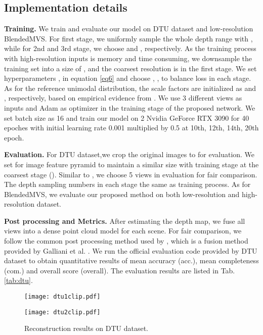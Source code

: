 \documentclass{article}
\begin{document}
\vspace{1mm}

\subsection{Implementation details}
{\bf Training.}
We train and evaluate our model on DTU dataset and low-resolution BlendedMVS.
For first stage, we uniformly sample the whole depth range  with , while for 2nd and 3rd stage, we choose  and , respectively.
As the training process with high-resolution inputs is memory and time consuming, we downsample the training set into a size of , and the coarsest resolution is  in the first stage.
We set hyperparameters ,  in equation \eqref{eq6} and choose , ,  to balance  loss in each stage.
As for the reference unimodal distribution, the scale factors are initialized as  and , respectively, based on empirical evidence from \cite{zhang2020adaptive}.
We use 3 different views as inputs and Adam \cite{kingma2014adam} as optimizer in the training stage of the proposed network.
We set batch size as 16 and train our model on 2 Nvidia GeForce RTX 3090 for 40 epoches with initial learning rate 0.001 multiplied by 0.5 at 10th, 12th, 14th, 20th epoch. \par
{\bf Evaluation.}
For DTU dataset,we crop the original images to  for evaluation.
We set  for image feature pyramid to maintain a similar size with training stage at the coarsest stage ().
Similar to \cite{yao2018mvsnet,yao2019recurrent,yang2020cost}, we choose 5 views in evaluation for fair comparison.
The depth sampling numbers  in each stage the same as training process.
As for BlendedMVS, we evaluate our proposed method on both low-resolution and high-resolution dataset. \par
{\bf Post processing and Metrics.}
After estimating the depth map, we fuse all views into a dense point cloud model for each scene.
For fair comparison, we follow the common post processing method used by \cite{yao2018mvsnet,yao2019recurrent,yang2020cost}, which is a fusion method provided by Galliani et al. \cite{galliani2015massively}.
We run the official evaluation code provided by DTU dataset \cite{aanaes2016large} to obtain quantitative results of mean accuracy (acc.), mean completeness (com.) and overall score (overall).
The evaluation results are listed in Tab.\ref{tab:dtu}.
\begin{figure}
	\begin{minipage}[t]{0.52\linewidth}
		\centering
		\texttt{[image: dtu1clip.pdf]}
	\end{minipage}
	\begin{minipage}[t]{0.44\linewidth}
		\centering
		\texttt{[image: dtu2clip.pdf]}
	\end{minipage}
	\caption{Reconstruction results on DTU dataset.}
	\label{figure:dtu}
\end{figure}
\end{document}

